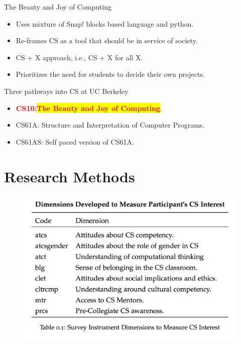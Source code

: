 \documentclass{beamer}                  %
\newcommand{\hilight}[1]{\colorbox{yellow}{#1}}
\begin{document}
        \begin{frame}{}
            The Beauty and Joy of Computing
            \begin{itemize}
                 \item Uses mixture of Snap! blocks based language and python.
                 \item Re-frames CS as a tool that should be in service of society.
                 \item CS + X approach, i.e., CS + X for all X.
                 \item Prioritizes the need for students to decide their own projects.
            \end{itemize}
        \end{frame}

        \begin{frame}{}
        Three pathways into CS at UC Berkeley
            \begin{itemize}
                \item \textcolor{red}{\textbf{CS10:\hilight{The Beauty and Joy of Computing}}}.
                \item CS61A: Structure and Interpretation of Computer Programs.
                \item CS61AS: Self paced version of CS61A.

            \end{itemize}
        \end{frame}






\section{Research Methods}
\begin{frame}{}

  \begin{figure}[!htbp]
      \centering
      
      \includegraphics[width=1\textwidth]{CSAttitudes}
      
        
  \end{figure}

\end{frame}
\end{document}
